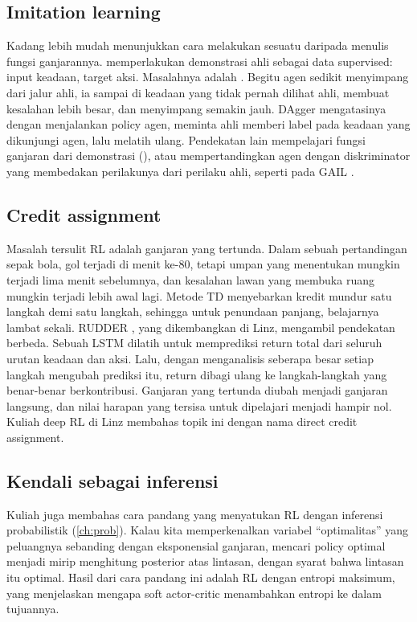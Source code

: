 \subsection{Imitation learning}

Kadang lebih mudah menunjukkan cara melakukan sesuatu daripada menulis fungsi ganjarannya.
 memperlakukan demonstrasi ahli sebagai data supervised: input keadaan,
target aksi. Masalahnya adalah . Begitu agen sedikit menyimpang dari jalur
ahli, ia sampai di keadaan yang tidak pernah dilihat ahli, membuat kesalahan lebih besar, dan
menyimpang semakin jauh. DAgger \citep{ross2011} mengatasinya dengan menjalankan policy agen, meminta
ahli memberi label pada keadaan yang dikunjungi agen, lalu melatih ulang. Pendekatan lain
mempelajari fungsi ganjaran dari demonstrasi (), atau
mempertandingkan agen dengan diskriminator yang membedakan perilakunya dari perilaku ahli, seperti
pada GAIL \citep{ho2016}.

\subsection{Credit assignment}

Masalah tersulit RL adalah ganjaran yang tertunda. Dalam sebuah pertandingan sepak bola, gol terjadi
di menit ke-80, tetapi umpan yang menentukan mungkin terjadi lima menit sebelumnya, dan kesalahan
lawan yang membuka ruang mungkin terjadi lebih awal lagi. Metode TD menyebarkan kredit mundur satu
langkah demi satu langkah, sehingga untuk penundaan panjang, belajarnya lambat sekali. RUDDER
\citep{arjonamedina2019}, yang dikembangkan di Linz, mengambil pendekatan berbeda. Sebuah LSTM dilatih
untuk memprediksi return total dari seluruh urutan keadaan dan aksi. Lalu, dengan menganalisis
seberapa besar setiap langkah mengubah prediksi itu, return dibagi ulang ke langkah-langkah yang
benar-benar berkontribusi. Ganjaran yang tertunda diubah menjadi ganjaran langsung, dan nilai harapan
yang tersisa untuk dipelajari menjadi hampir nol. Kuliah deep RL di Linz membahas topik ini dengan
nama direct credit assignment.

\subsection{Kendali sebagai inferensi}

Kuliah juga membahas cara pandang yang menyatukan RL dengan inferensi probabilistik (\cref{ch:prob}).
Kalau kita memperkenalkan variabel ``optimalitas'' yang peluangnya sebanding dengan eksponensial
ganjaran, mencari policy optimal menjadi mirip menghitung posterior atas lintasan, dengan syarat
bahwa lintasan itu optimal. Hasil dari cara pandang ini adalah RL dengan entropi maksimum, yang
menjelaskan mengapa soft actor-critic menambahkan entropi ke dalam tujuannya.


